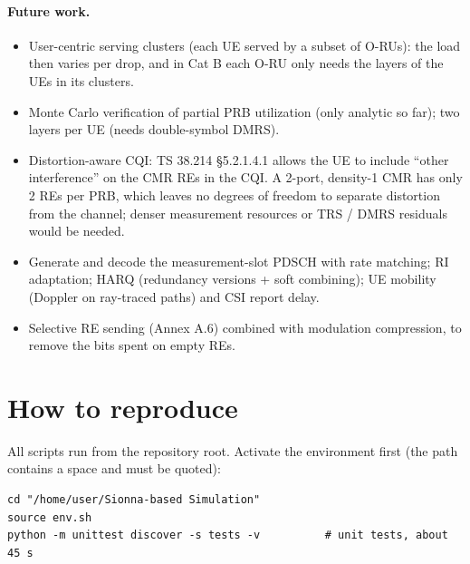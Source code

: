 \documentclass[11pt,a4paper]{article}
\begin{document}
\paragraph{Future work.}
\begin{itemize}
  \item User-centric serving clusters (each UE served by a subset of O-RUs): the load then varies per drop, and in Cat B each
        O-RU only needs the layers of the UEs in its clusters.
  \item Monte Carlo verification of partial PRB utilization (only analytic so far); two layers per UE (needs double-symbol DMRS).
  \item Distortion-aware CQI: TS 38.214 \S 5.2.1.4.1 allows the UE to include ``other interference'' on the CMR REs in the CQI.
        A 2-port, density-1 CMR has only 2 REs per PRB, which leaves no degrees of freedom to separate distortion from the channel;
        denser measurement resources or TRS / DMRS residuals would be needed.
  \item Generate and decode the measurement-slot PDSCH with rate matching; RI adaptation; HARQ (redundancy versions + soft
        combining); UE mobility (Doppler on ray-traced paths) and CSI report delay.
  \item Selective RE sending (Annex A.6) combined with modulation compression, to remove the bits spent on empty REs.
\end{itemize}

\appendix
\section{How to reproduce}

All scripts run from the repository root. Activate the environment first (the path contains a space and must be quoted):
\begin{lstlisting}
cd "/home/user/Sionna-based Simulation"
source env.sh
python -m unittest discover -s tests -v          # unit tests, about 45 s
\end{lstlisting}
\end{document}
